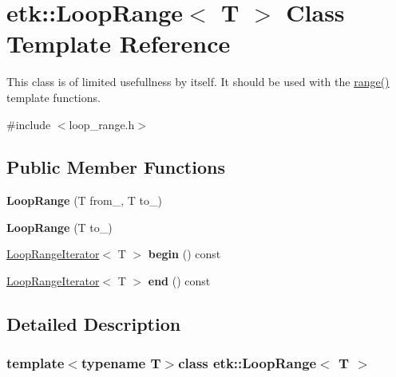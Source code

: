 \hypertarget{classetk_1_1_loop_range}{\section{etk\-:\-:Loop\-Range$<$ T $>$ Class Template Reference}
\label{classetk_1_1_loop_range}
}


This class is of limited usefullness by itself. It should be used with the \hyperlink{namespaceetk_aff39b0f367ee4d947e2e7d297ffd506b}{range()} template functions.  




{\ttfamily \#include $<$loop\-\_\-range.\-h$>$}

\subsection*{Public Member Functions}
\begin{DoxyCompactItemize}
\item 
\hypertarget{classetk_1_1_loop_range_a3520ba367e7ad86c8e3fb5ecd7a63692}{{\bfseries Loop\-Range} (T from\-\_\-, T to\-\_\-)}\label{classetk_1_1_loop_range_a3520ba367e7ad86c8e3fb5ecd7a63692}

\item 
\hypertarget{classetk_1_1_loop_range_a6e74f73210af0ff35a8c701f9243c4b3}{{\bfseries Loop\-Range} (T to\-\_\-)}\label{classetk_1_1_loop_range_a6e74f73210af0ff35a8c701f9243c4b3}

\item 
\hypertarget{classetk_1_1_loop_range_a03dc63b4ba3c7ff6d0c8b4be80295976}{\hyperlink{classetk_1_1_loop_range_iterator}{Loop\-Range\-Iterator}$<$ T $>$ {\bfseries begin} () const }\label{classetk_1_1_loop_range_a03dc63b4ba3c7ff6d0c8b4be80295976}

\item 
\hypertarget{classetk_1_1_loop_range_a5b531d7156af411cbceab6c6c039ee84}{\hyperlink{classetk_1_1_loop_range_iterator}{Loop\-Range\-Iterator}$<$ T $>$ {\bfseries end} () const }\label{classetk_1_1_loop_range_a5b531d7156af411cbceab6c6c039ee84}

\end{DoxyCompactItemize}


\subsection{Detailed Description}
\subsubsection*{template$<$typename T$>$class etk\-::\-Loop\-Range$<$ T $>$}

